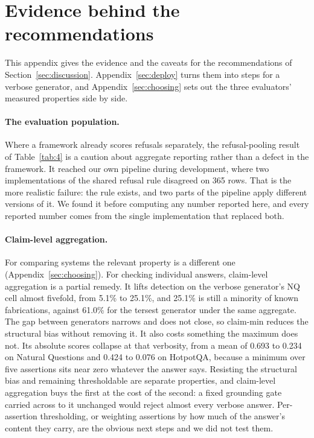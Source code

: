 \section{Evidence behind the recommendations}
\label{sec:discussion-detail}

This appendix gives the evidence and the caveats for the recommendations of Section~\ref{sec:discussion}. Appendix~\ref{sec:deploy} turns them into steps for a verbose generator, and Appendix~\ref{sec:choosing} sets out the three evaluators' measured properties side by side.

\paragraph{The evaluation population.} Where a framework already scores refusals separately, the refusal-pooling result of Table~\ref{tab:4} is a caution about aggregate reporting rather than a defect in the framework. It reached our own pipeline during development, where two implementations of the shared refusal rule disagreed on 365 rows. That is the more realistic failure: the rule exists, and two parts of the pipeline apply different versions of it. We found it before computing any number reported here, and every reported number comes from the single implementation that replaced both.

\paragraph{Claim-level aggregation.} For comparing systems the relevant property is a different one (Appendix~\ref{sec:choosing}). For checking individual answers, claim-level aggregation is a partial remedy. It lifts detection on the verbose generator's NQ cell almost fivefold, from 5.1\% to 25.1\%, and 25.1\% is still a minority of known fabrications, against 61.0\% for the tersest generator under the same aggregate. The gap between generators narrows and does not close, so claim-min reduces the structural bias without removing it. It also costs something the maximum does not. Its absolute scores collapse at that verbosity, from a mean of 0.693 to 0.234 on Natural Questions and 0.424 to 0.076 on HotpotQA, because a minimum over five assertions sits near zero whatever the answer says. Resisting the structural bias and remaining thresholdable are separate properties, and claim-level aggregation buys the first at the cost of the second: a fixed grounding gate carried across to it unchanged would reject almost every verbose answer. Per-assertion thresholding, or weighting assertions by how much of the answer's content they carry, are the obvious next steps and we did not test them.

